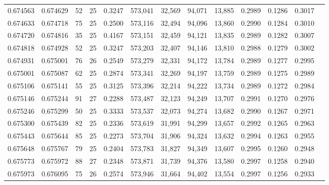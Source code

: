 \begin{tabular}{rrrrrrrrrrrrr}
0.674563 & 0.674629 &  52 &  25 &                                     0.3247 & 573,041 &  32,569 &  94,071 &  13,885 & 0.2989 & 0.1286 & 0.3017 \\
0.674633 & 0.674718 &  75 &  25 &                                     0.2500 & 573,116 &  32,494 &  94,096 &  13,860 & 0.2990 & 0.1284 & 0.3010 \\
0.674720 & 0.674816 &  35 &  25 &                                     0.4167 & 573,151 &  32,459 &  94,121 &  13,835 & 0.2989 & 0.1282 & 0.3007 \\
0.674818 & 0.674928 &  52 &  25 &                                     0.3247 & 573,203 &  32,407 &  94,146 &  13,810 & 0.2988 & 0.1279 & 0.3002 \\
0.674931 & 0.675001 &  76 &  26 &                                     0.2549 & 573,279 &  32,331 &  94,172 &  13,784 & 0.2989 & 0.1277 & 0.2995 \\
0.675001 & 0.675087 &  62 &  25 &                                     0.2874 & 573,341 &  32,269 &  94,197 &  13,759 & 0.2989 & 0.1275 & 0.2989 \\
0.675106 & 0.675141 &  55 &  25 &                                     0.3125 & 573,396 &  32,214 &  94,222 &  13,734 & 0.2989 & 0.1272 & 0.2984 \\
0.675146 & 0.675244 &  91 &  27 &                                     0.2288 & 573,487 &  32,123 &  94,249 &  13,707 & 0.2991 & 0.1270 & 0.2976 \\
0.675246 & 0.675299 &  50 &  25 &                                     0.3333 & 573,537 &  32,073 &  94,274 &  13,682 & 0.2990 & 0.1267 & 0.2971 \\
0.675300 & 0.675439 &  82 &  25 &                                     0.2336 & 573,619 &  31,991 &  94,299 &  13,657 & 0.2992 & 0.1265 & 0.2963 \\
0.675443 & 0.675644 &  85 &  25 &                                     0.2273 & 573,704 &  31,906 &  94,324 &  13,632 & 0.2994 & 0.1263 & 0.2955 \\
0.675648 & 0.675767 &  79 &  25 &                                     0.2404 & 573,783 &  31,827 &  94,349 &  13,607 & 0.2995 & 0.1260 & 0.2948 \\
0.675773 & 0.675972 &  88 &  27 &                                     0.2348 & 573,871 &  31,739 &  94,376 &  13,580 & 0.2997 & 0.1258 & 0.2940 \\
0.675973 & 0.676095 &  75 &  26 &                                     0.2574 & 573,946 &  31,664 &  94,402 &  13,554 & 0.2997 & 0.1256 & 0.2933 \\

\end{tabular}
